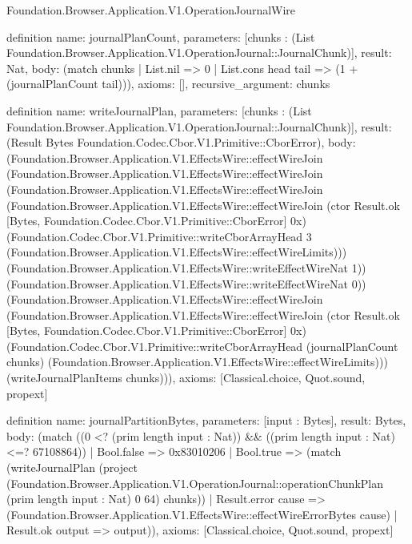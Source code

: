 \begin{lexlean}{Foundation.Browser.Application.V1.OperationJournalWire}
\begin{semanticmodule}
definition{
  name: journalPlanCount,
  parameters: [chunks : (List Foundation.Browser.Application.V1.OperationJournal::JournalChunk)],
  result: Nat,
  body: (match chunks | List.nil => 0 | List.cons head tail => (1 + (journalPlanCount tail))),
  axioms: [],
  recursive_argument: chunks
}

definition{
  name: writeJournalPlan,
  parameters: [chunks : (List Foundation.Browser.Application.V1.OperationJournal::JournalChunk)],
  result: (Result Bytes Foundation.Codec.Cbor.V1.Primitive::CborError),
  body: (Foundation.Browser.Application.V1.EffectsWire::effectWireJoin (Foundation.Browser.Application.V1.EffectsWire::effectWireJoin (Foundation.Browser.Application.V1.EffectsWire::effectWireJoin (Foundation.Browser.Application.V1.EffectsWire::effectWireJoin (ctor Result.ok [Bytes, Foundation.Codec.Cbor.V1.Primitive::CborError] 0x) (Foundation.Codec.Cbor.V1.Primitive::writeCborArrayHead 3 (Foundation.Browser.Application.V1.EffectsWire::effectWireLimits))) (Foundation.Browser.Application.V1.EffectsWire::writeEffectWireNat 1)) (Foundation.Browser.Application.V1.EffectsWire::writeEffectWireNat 0)) (Foundation.Browser.Application.V1.EffectsWire::effectWireJoin (Foundation.Browser.Application.V1.EffectsWire::effectWireJoin (ctor Result.ok [Bytes, Foundation.Codec.Cbor.V1.Primitive::CborError] 0x) (Foundation.Codec.Cbor.V1.Primitive::writeCborArrayHead (journalPlanCount chunks) (Foundation.Browser.Application.V1.EffectsWire::effectWireLimits))) (writeJournalPlanItems chunks))),
  axioms: [Classical.choice, Quot.sound, propext]
}

definition{
  name: journalPartitionBytes,
  parameters: [input : Bytes],
  result: Bytes,
  body: (match ((0 <? (prim length input : Nat)) && ((prim length input : Nat) <=? 67108864))
    | Bool.false => 0x83010206
    | Bool.true => (match (writeJournalPlan (project (Foundation.Browser.Application.V1.OperationJournal::operationChunkPlan (prim length input : Nat) 0 64) chunks))
      | Result.error cause => (Foundation.Browser.Application.V1.EffectsWire::effectWireErrorBytes cause)
      | Result.ok output => output)),
  axioms: [Classical.choice, Quot.sound, propext]
}
\end{semanticmodule}
\end{lexlean}
